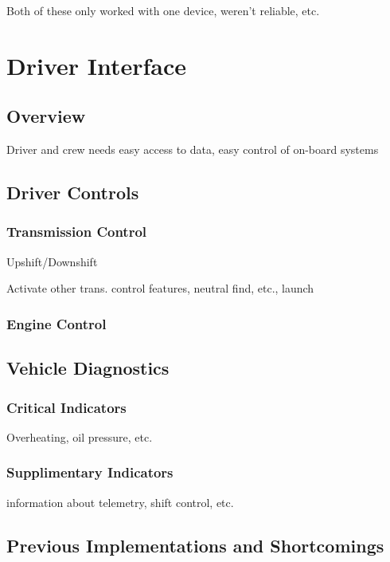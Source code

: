 Both of these only worked with one device, weren't reliable, etc.


\section{Driver Interface}


\subsection{Overview}

Driver and crew needs easy access to data, easy control of on-board
systems


\subsection{Driver Controls}


\subsubsection{Transmission Control}

Upshift/Downshift

Activate other trans. control features, neutral find, etc., launch


\subsubsection{Engine Control}


\subsection{Vehicle Diagnostics}


\subsubsection{Critical Indicators}

Overheating, oil pressure, etc.


\subsubsection{Supplimentary Indicators}

information about telemetry, shift control, etc.


\subsection{Previous Implementations and Shortcomings}